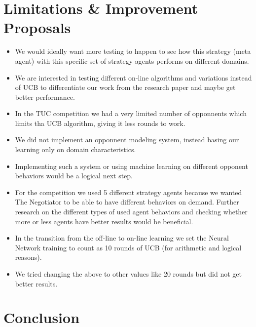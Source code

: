 \documentclass[12pt]{article}
\numberwithin{equation}{section}
\begin{document}
	\section{Limitations \& Improvement Proposals}		\label{sec:limitations_improvements}
	
		\begin{itemize}
			\item We would ideally want more testing to happen to see how this strategy (meta agent) with this specific set of strategy agents performs on different domains.
			\item We are interested in testing different on-line algorithms and variations instead of UCB to differentiate our work from the research paper \cite{meta_agent_paper} and maybe get better performance.
			\item In the TUC competition we had a very limited number of opponnents which limits tha UCB algorithm, giving it less rounds to work.
			\item We did not implement an opponnent modeling system, instead basing our learning only on domain characteristics.
			\item Implementing such a system or using machine learning on different opponent behaviors would be a logical next step.
			\item For the competition we used 5 different strategy agents because we wanted The Negotiator to be able to have different behaviors on demand. Further research on the different types of used agent behaviors and checking whether more or less agents have better results would be beneficial. 
			\item In the transition from the off-line to on-line learning we set the Neural Network training to count as 10 rounds of UCB (for arithmetic and logical reasons).
			\item We tried changing the above to other values like 20 rounds but did not get better results.
		\end{itemize}

	\section*{Conclusion}		\label{sec:conclusion}



	
	
\end{document}
